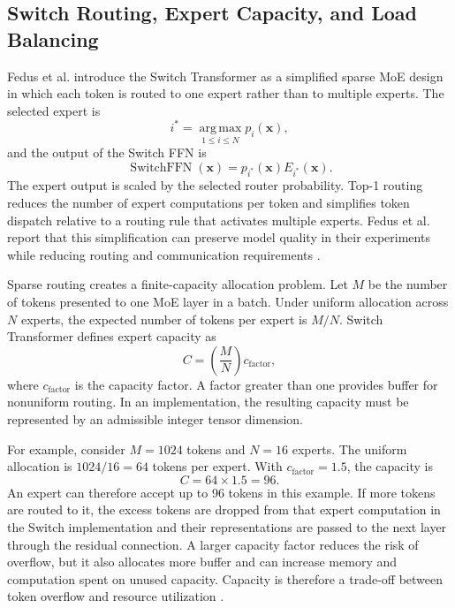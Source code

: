 \subsection{Switch Routing, Expert Capacity, and Load Balancing}
\label{subsec:ffn-switch-routing}

Fedus et al. introduce the Switch Transformer as a simplified sparse
MoE design in which each token is routed to one expert rather than to
multiple experts. The selected expert is
\begin{equation}
    i^{*}
    =
    \operatorname*{arg\,max}_{1\leq i\leq N}
    p_i(\mathbf{x}),
    \label{eq:switch-top-one}
\end{equation}
and the output of the Switch FFN is
\begin{equation}
    \operatorname{SwitchFFN}(\mathbf{x})
    =
    p_{i^{*}}(\mathbf{x})E_{i^{*}}(\mathbf{x}).
    \label{eq:switch-output}
\end{equation}
The expert output is scaled by the selected router probability. Top-1
routing reduces the number of expert computations per token and
simplifies token dispatch relative to a routing rule that activates
multiple experts. Fedus et al. report that this simplification can
preserve model quality in their experiments while reducing routing
and communication requirements \parencite{fedus2022switch}.

Sparse routing creates a finite-capacity allocation problem. Let \(M\)
be the number of tokens presented to one MoE layer in a batch. Under
uniform allocation across \(N\) experts, the expected number of tokens
per expert is \(M/N\). Switch Transformer defines expert capacity as
\begin{equation}
    C
    =
    \left(\frac{M}{N}\right)c_{\mathrm{factor}},
    \label{eq:switch-expert-capacity}
\end{equation}
where \(c_{\mathrm{factor}}\) is the capacity factor. A factor greater
than one provides buffer for nonuniform routing. In an implementation,
the resulting capacity must be represented by an admissible integer
tensor dimension.

For example, consider \(M=1024\) tokens and \(N=16\) experts. The
uniform allocation is \(1024/16=64\) tokens per expert. With
\(c_{\mathrm{factor}}=1.5\), the capacity is
\[
    C=64\times1.5=96.
\]
An expert can therefore accept up to 96 tokens in this example.
If more tokens are routed to it, the excess tokens are dropped from
that expert computation in the Switch implementation and their
representations are passed to the next layer through the residual
connection. A larger capacity factor reduces the risk of overflow,
but it also allocates more buffer and can increase memory and
computation spent on unused capacity. Capacity is therefore a
trade-off between token overflow and resource utilization
\parencite{fedus2022switch}.

